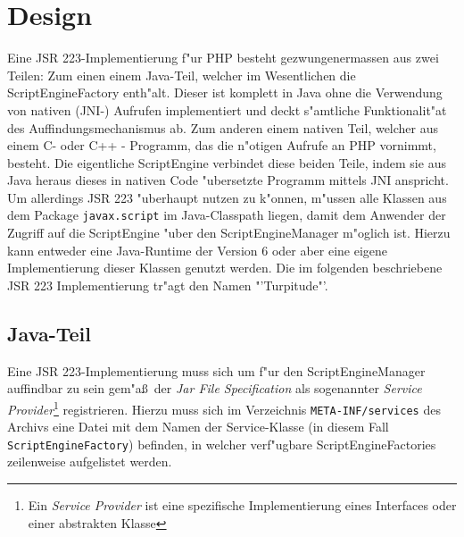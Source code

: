 \section{Design}
\label{sec:chap1:design}

Eine JSR 223-Implementierung f"ur PHP besteht gezwungenermassen aus zwei Teilen: Zum einen einem Java-Teil, welcher im Wesentlichen
die ScriptEngineFactory enth"alt. Dieser ist komplett in Java ohne die Verwendung von nativen (JNI-) Aufrufen implementiert und
deckt s"amtliche Funktionalit"at des Auffindungsmechanismus ab. Zum anderen einem nativen Teil, welcher aus 
einem C- oder C++ - Programm, das die n"otigen Aufrufe an PHP vornimmt, besteht.
Die eigentliche ScriptEngine verbindet diese beiden Teile, indem sie aus Java heraus dieses in nativen Code "ubersetzte 
Programm mittels JNI anspricht.
Um allerdings JSR 223 "uberhaupt nutzen zu k"onnen, m"ussen alle Klassen aus dem Package \texttt{javax.script}
im Java-Classpath liegen, damit dem Anwender der Zugriff auf die ScriptEngine "uber den ScriptEngineManager m"oglich ist.
Hierzu kann entweder eine Java-Runtime der Version 6 oder aber eine eigene Implementierung dieser Klassen genutzt werden. 
Die im folgenden beschriebene JSR 223 Implementierung tr"agt den Namen "'Turpitude"'.

\subsection{Java-Teil}
\label{sec:chap1:design:java}

Eine JSR 223-Implementierung muss sich um f"ur den ScriptEngineManager auffindbar zu sein gem"a\ss\ der 
\emph{Jar File Specification} \cite{JARSPEC} als sogenannter \emph{Service Provider}\footnote{
Ein \emph{Service Provider} ist eine spezifische Implementierung eines Interfaces oder einer abstrakten Klasse
} registrieren. Hierzu muss sich im Verzeichnis \texttt{META-INF/services} des Archivs eine Datei
mit dem Namen der Service-Klasse (in diesem Fall \texttt{ScriptEngineFactory}) befinden, in welcher verf"ugbare 
ScriptEngineFactories zeilenweise aufgelistet werden.

